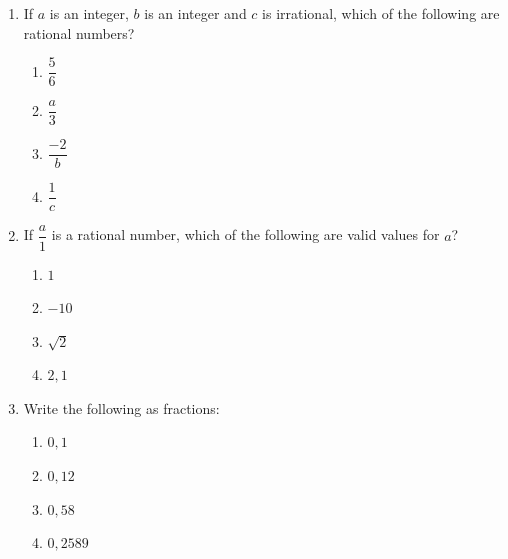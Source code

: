 \begin{exercises}{}{
\begin{enumerate}[itemsep=5pt, label=\textbf{\arabic*}. ] 
\item If $a$ is an integer, $b$ is an integer and $c$ is irrational, which of the following are rational numbers? 
  \begin{enumerate}[itemsep=5pt, label=\textbf{(\alph*)} ] 
    \item $\dfrac{5}{6}$
    \item $\dfrac{a}{3}$
    \item $\dfrac{-2}{b}$
    \item $\dfrac{1}{c}$
    \end{enumerate}
\item If $\dfrac{a}{1}$ is a rational number, which of the following are valid values for $a$?
    \begin{enumerate}[itemsep=5pt, label=\textbf{(\alph*)} ] 
    \item $1$
    \item $-10$
    \item $\sqrt{2}$
    \item $2,1$
    \end{enumerate}
% 
\item Write the following as fractions:
    \begin{enumerate}[itemsep=5pt, label=\textbf{(\alph*)} ] 
    \item $0,1$
    \item $0,12$
    \item $0,58$
    \item $0,2589$
    \end{enumerate}

\end{enumerate}}
\end{exercises}
